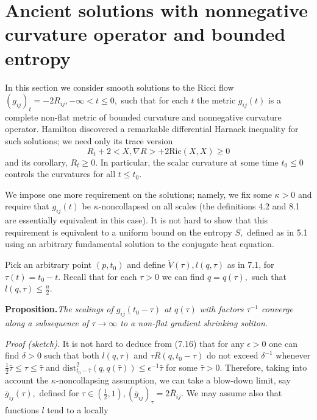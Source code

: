 \documentclass[12pt]{article}
\newcommand{\e}{\epsilon}
\newcommand{\de}{\delta}
\theoremstyle{plain}
{\swapnumbers
\newtheorem{thm}{Theorem}[section]
\newtheorem{cor}[thm]{Corollary}
\newtheorem{lem}[thm]{Lemma}
\newtheorem{prop}[thm]{Proposition}
}
\theoremstyle{definition}
{\swapnumbers
\newtheorem{defn}[thm]{Definition}
\newtheorem{nota}[thm]{Notation}
\newtheorem{parag}[thm]{}
\newtheorem*{parstr}{\addtocounter{thm}{1}\thesection.\arabic{thm}*}
\newtheorem*{intropar}{\addtocounter{thm}{1}\arabic{thm}}
}
\theoremstyle{remark} {\swapnumbers
\newtheorem{rem}[thm]{Remark}
\newtheorem{exam}[thm]{Example}
\newtheorem{lemma}[thm]{Lemma}
\newtheorem{claim}[thm]{Claim}
}
\numberwithin{equation}{section}
\begin{document}
 \section {Ancient solutions with nonnegative curvature operator and bounded entropy}
 \begin{parag}  In this section we consider smooth solutions to the
 Ricci flow $(g_{ij})_t=-2R_{ij}, -\infty<t\le 0,$ such that for
 each $t$ the metric $g_{ij}(t)$ is  a complete non-flat metric of bounded
 curvature and nonnegative curvature operator. Hamilton discovered
 a remarkable differential Harnack inequality for such solutions;
 we need only its trace version \begin{equation}  R_t+2<X,\nabla
 R>+2\mbox{Ric}(X,X)\ge 0\end{equation} and its corollary, $R_t\ge 0.$ In
 particular, the scalar curvature at some time $t_0\le 0$ controls
 the curvatures for all $t\le t_0.$ \par We impose one more
 requirement on the solutions; namely, we fix some $\kappa >0$ and
 require that $g_{ij}(t)$ be $\kappa$-noncollapsed on all scales
 (the definitions 4.2 and 8.1 are essentially equivalent in this
 case). It is not hard to show that this
 requirement is equivalent to a uniform bound
 on the entropy $S,$ defined as in 5.1 using an arbitrary
 fundamental solution to the conjugate heat
 equation. \end{parag} \begin{parag} Pick an arbitrary point $(p,t_0)$ and define
 $\tilde{V}(\tau), l(q,\tau)$ as in 7.1, for $\tau(t)=t_0-t.$
 Recall that for each $\tau>0$ we can find $q=q(\tau),$ such that
 $l(q,\tau)\le \frac{n}{2}.$ \par {\bf Proposition.}{\it The scalings of
 $g_{ij}(t_0-\tau)$ at $q(\tau)$ with factors $\tau^{-1}$ converge
 along a subsequence of $\tau\to\infty$ to a non-flat gradient shrinking
 soliton. }\par
 {\it Proof (sketch).} It is not hard to deduce from (7.16) that for any
 $\e >0$ one can find $\de >0$ such that both $ l(q,\tau)$ and
 $\tau R(q,t_0-\tau)$  do not exceed $\de ^{-1}$ whenever
 $\frac{1}{2}\bar{\tau}\le \tau\le \bar{\tau}$ and
 $\mbox{dist}_{t_0-\bar{\tau}}^2(q,q(\bar{\tau}))\le
 \e^{-1}\bar{\tau}$ for some $\bar{\tau}>0.$ Therefore, taking
 into account the $\kappa$-noncollapsing assumption, we can take a
 blow-down limit, say $\bar{g}_{ij}(\tau),$ defined for
 $\tau\in(\frac{1}{2},1), (\bar{g}_{ij})_{\tau}=2\bar{R}_{ij}.$
  We may assume also that functions $l$ tend to a locally

\end{parag}
\end{document}
